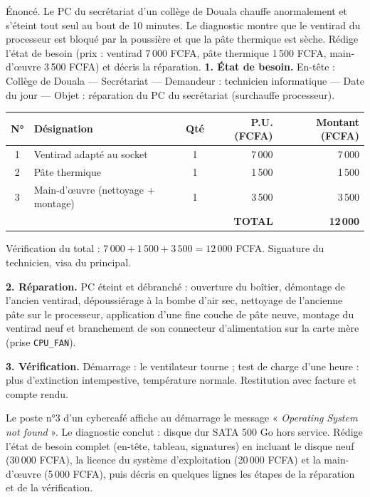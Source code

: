 \documentclass[11pt]{article}
\begin{document}
\begin{exoresolu}
Énoncé. Le PC du secrétariat d'un collège de Douala chauffe anormalement et s'éteint tout seul au bout de 10 minutes. Le diagnostic montre que le ventirad du processeur est bloqué par la poussière et que la pâte thermique est sèche. Rédige l'état de besoin (prix : ventirad 7\,000 FCFA, pâte thermique 1\,500 FCFA, main-d'œuvre 3\,500 FCFA) et décris la réparation.
\tcblower
\textbf{1. État de besoin.} En-tête : Collège de Douala — Secrétariat — Demandeur : technicien informatique — Date du jour — Objet : réparation du PC du secrétariat (surchauffe processeur).

\begin{center}
\small
\begin{tabularx}{\linewidth}{|c|X|c|r|r|}
\hline
\rowcolor{popblueL}
\textbf{N°} & \textbf{Désignation} & \textbf{Qté} & \textbf{P.U. (FCFA)} & \textbf{Montant (FCFA)} \\
\hline
1 & Ventirad adapté au socket & 1 & 7\,000 & 7\,000 \\
\hline
2 & Pâte thermique & 1 & 1\,500 & 1\,500 \\
\hline
3 & Main-d'œuvre (nettoyage + montage) & 1 & 3\,500 & 3\,500 \\
\hline
\multicolumn{4}{|r|}{\textbf{TOTAL}} & \textbf{12\,000} \\
\hline
\end{tabularx}
\end{center}

Vérification du total : $7\,000 + 1\,500 + 3\,500 = 12\,000$ FCFA. Signature du technicien, visa du principal.

\textbf{2. Réparation.} PC éteint et débranché : ouverture du boîtier, démontage de l'ancien ventirad, dépoussiérage à la bombe d'air sec, nettoyage de l'ancienne pâte sur le processeur, application d'une fine couche de pâte neuve, montage du ventirad neuf et branchement de son connecteur d'alimentation sur la carte mère (prise \texttt{CPU\_FAN}).

\textbf{3. Vérification.} Démarrage : le ventilateur tourne ; test de charge d'une heure : plus d'extinction intempestive, température normale. Restitution avec facture et compte rendu.
\end{exoresolu}

\begin{exercice}
Le poste n°3 d'un cybercafé affiche au démarrage le message « \emph{Operating System not found} ». Le diagnostic conclut : disque dur SATA 500 Go hors service. Rédige l'état de besoin complet (en-tête, tableau, signatures) en incluant le disque neuf (30\,000 FCFA), la licence du système d'exploitation (20\,000 FCFA) et la main-d'œuvre (5\,000 FCFA), puis décris en quelques lignes les étapes de la réparation et de la vérification.
\end{exercice}
\end{document}
